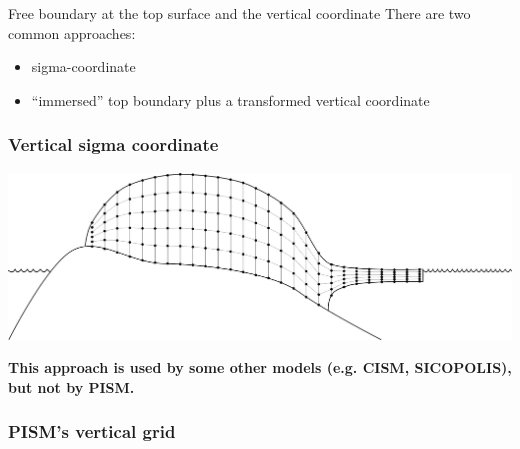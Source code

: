 \documentclass[hide notes,intlimits]{beamer}
\begin{document}

\begin{frame}{Free boundary at the top surface and the vertical coordinate}
  There are two common approaches:
  \begin{itemize}
  \item sigma-coordinate
  \item ``immersed'' top boundary plus a transformed vertical
    coordinate
  \end{itemize}
\end{frame}

\begin{frame}
  \frametitle{Vertical sigma coordinate}
  \begin{center}
    \includegraphics[width=\linewidth]{grid-vertical-sigma}

    \textbf{This approach is used by some other models (e.g. CISM,
      SICOPOLIS), but not by PISM.}
  \end{center}
\end{frame}

\begin{frame}
  \frametitle{PISM's vertical grid}
  \begin{center}
  \end{center}
\end{frame}
\end{document}
